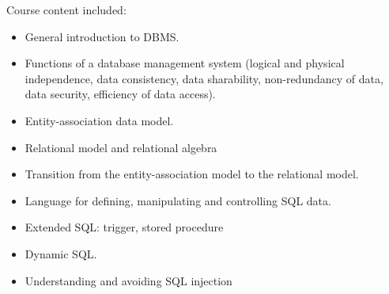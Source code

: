 Course content included:
\begin{itemize}
    \item General introduction to DBMS.
    \item Functions of a database management system (logical and physical independence, data consistency, data sharability, non-redundancy of data, data security, efficiency of data access).
    \item Entity-association data model.
    \item Relational model and relational algebra
    \item Transition from the entity-association model to the relational model.
    \item Language for defining, manipulating and controlling SQL data.
    \item Extended SQL: trigger, stored procedure
    \item Dynamic SQL.
    \item Understanding and avoiding SQL injection
\end{itemize}
